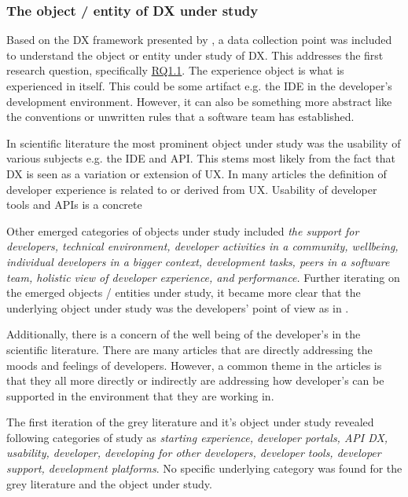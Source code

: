 \documentclass[english, 12pt, a4paper, sci, utf8, a-1b, online]{aaltothesis}
\newcounter{subsubsubsection}[subsubsection]
\begin{document}
\subsubsection{The object / entity of DX under study}

Based on the DX framework presented by \citet{fagerholm-doctoral-thesis}, a data collection point was included to understand the object or entity under study of DX. This addresses the first research question, specifically \hyperref[RQ1.1]{RQ1.1}. The experience object is what is experienced in itself. This could be some artifact e.g. the IDE in the developer's development environment. However, it can also be something more abstract like the conventions or unwritten rules that a software team has established.


In scientific literature the most prominent object under study was the usability of various subjects e.g. the IDE and API. This stems most likely from the fact that DX is seen as a variation or extension of UX. In many articles the definition of developer experience is related to or derived from UX. Usability of developer tools and APIs is a concrete

Other emerged categories of objects under study included \textit{the support for developers, technical environment, developer activities in a community, wellbeing, individual developers in a bigger context, development tasks, peers in a software team, holistic view of developer experience, and performance.} Further iterating on the emerged objects / entities under study, it became more clear that the underlying object under study was the developers' point of view as in \cite{voice-of-the-developer}.

Additionally, there is a concern of the well being of the developer's in the scientific literature. There are many articles that are directly addressing the moods and feelings of developers. However, a common theme in the articles is that they all more directly or indirectly are addressing how developer's can be supported in the environment that they are working in.


The first iteration of the grey literature and it's object under study revealed following categories of study as \textit{starting experience, developer portals, API DX, usability, developer, developing for other developers, developer tools, developer support, development platforms}. No specific underlying category was found for the grey literature and the object under study.
\end{document}
